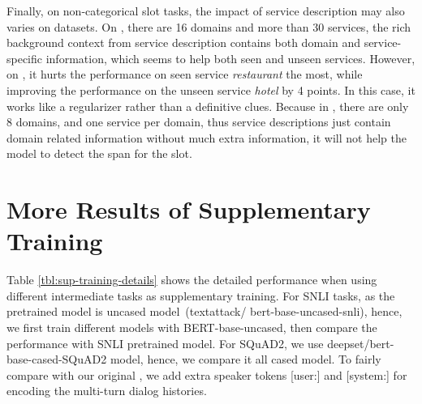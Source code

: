 Finally, on non-categorical slot tasks, the impact of service
description may also varies on datasets. On \sgdst, there are 16
domains and more than 30 services, the rich background context from
service description contains both domain and service-specific
information, which seems to help both seen and unseen
services. However, on \multiwoz, it hurts the performance on seen
service {\it restaurant} the most, while improving the performance on
the unseen service {\it hotel} by 4 points. In this case, it works
like a regularizer rather than a definitive clues. Because in
\multiwoz, there are only 8 domains, and one service per domain, thus
service descriptions just contain domain related information without
much extra information, it will not help the model to detect the span
for the slot.
%
%
%

\section{More Results of Supplementary Training}
\label{sec:sgd:appendices-results-sup-training}
Table \ref{tbl:sup-training-details} shows the detailed performance
when using different intermediate tasks as supplementary training.  For
SNLI tasks, as the pretrained model is uncased model~(textattack/
bert-base-uncased-snli), hence, we first train different models with
BERT-base-uncased, then compare the performance with SNLI pretrained
model. For SQuAD2, we use deepset/bert-base-cased-SQuAD2 model, hence,
we compare it all cased model. To fairly compare with our original
\CE, we add extra speaker tokens [user:] and [system:] for encoding
the multi-turn dialog histories.

